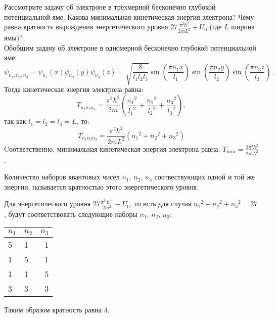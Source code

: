 \documentclass[__main__.tex]{subfiles}
\begin{document}
Рассмотрите задачу об электроне в трёхмерной бесконечно глубокой потенциальной яме. Какова минимальная кинетическая энергия электрона? Чему равна кратность вырождения энергетического уровня $27\frac{\pi^2\hbar^2}{2mL^2}+U_0$ (где $L$ ширина ямы)?\\

Обобщим задачу об электроне в одномерной бесконечно глубокой потенциальной яме:
$$
\psi_{{n_1},{n_2},{n_3}}=\psi_{n_1}(x)\psi_{n_2}(y)\psi_{n_3}(z) = \sqrt{\frac{8}{l_1 l_2 l_3}} \sin\left(\frac{\pi n_1 x}{l_1}\right) \sin\left(\frac{\pi n_2 y}{l_2}\right) \sin\left(\frac{\pi n_3 z}{l_3}\right).
$$
Тогда кинетическая энергия электрона равна:
$$
T_{n_1 n_2 n_3}=
\frac{\pi^2\hbar^2}{2m}\left(\frac{{n_1}^2}{{l_1}^2}
+
\frac{{n_2}^2}{{l_2}^2} + \frac{{n_3}^2}{{l_3}^2}\right),
$$
так как $l_1=l_2=l_3=L$, то:
$$
T_{n_1 n_2 n_3} =  \frac{\pi^2\hbar^2}{2m L^2}\left({n_1}^2 + {n_2}^2 + {n_3}^2\right)
$$
Cоответственно, минимальная кинетическая энергия электрона равна: $T_{min}=\frac{3\pi^2\hbar^2}{2m L^2}$.
\begin {definition}
Количество наборов квантовых чисел $n_1$, $n_2$, $n_3$ соотвествующих одной и той же энергии, называется кратностью этого энергетического уровня.
\end {definition}
Для энергетического уровня $27\frac{\pi^2\hslash^2}{2m^2}+U_0$, то есть для случая ${n_1}^2+{n_2}^2+{n_3}^2=27$, будут соответствовать следующие наборы $n_1$, $n_2$, $n_3$:
\begin {table}[h]
\centering
\begin {tabular}{llr}
\toprule
$n_1$ & $n_2$ & $n_3$ \\
\midrule
5 & 1 & 1 \\
1 & 5 & 1 \\
1 & 1 & 5 \\
3 & 3 & 3 \\
\bottomrule
\end {tabular}
\end {table}

Таким образом кратность равна $4$.
\end{document}
